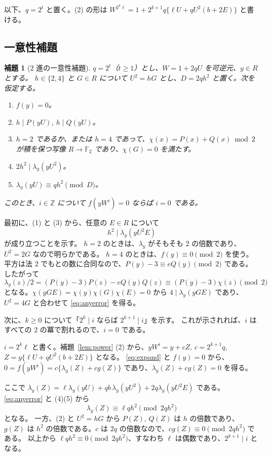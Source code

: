 \documentclass[a4paper,11pt]{ltjsarticle}
\makeatletter
\theoremstyle{jplain}
\newtheorem{lemma}[theorem]{補題}
\renewcommand{\proofname}{証明}
\renewenvironment{proof}[1][\proofname]{\par\pushQED{\qed}\normalfont\topsep6\p@\@plus6\p@\relax
  \trivlist\item[\hskip\labelsep\bfseries #1]\ignorespaces}{\popQED\endtrivlist\@endpefalse}
\numberwithin{equation}{section}
\numberwithin{table}{section}
\newcommand{\Z}{\mathbb{Z}}
\newcommand{\F}{\mathbb{F}}
\makeatother
\begin{document}
以下、$q=2^t$ と置く。(2) の形は $W^{2^k\ell}=1+2^{k+1}q\{\ell U+qU^2(b+2E)\}$ と書ける。

\subsection{一意性補題}

\begin{lemma}[$2$ 進の一意性補題]\label{lem:unique}
$q=2^t$（$t\ge1$）とし、$W=1+2qU$ を可逆元、$y\in R$ とする。
$h\in\{2,4\}$ と $G\in R$ について $U^2=hG$ とし、$D=2qh^2$ と置く。次を仮定する。
\begin{enumerate}
\item $f(y)=0$。
\item $h\mid P(yU)$, $h\mid Q(yU)$。
\item $h=2$ であるか、または $h=4$ であって、$\chi(x)=P(x)+Q(x)\bmod2$ が積を保つ写像 $R\to\F_2$ であり、$\chi(G)=0$ を満たす。
\item $2h^2\mid\lambda_y(yU^2)$。
\item $\lambda_y(yU)\equiv qh^2\pmod D$。
\end{enumerate}
このとき、$i\in\Z$ について $f(yW^i)=0$ ならば $i=0$ である。
\end{lemma}

\begin{proof}
最初に、(1) と (3) から、任意の $E\in R$ について
\begin{equation}\label{eq:anyerror}
h^2\mid\lambda_y(yU^2E)
\end{equation}
が成り立つことを示す。
$h=2$ のときは、$\lambda_y$ がそもそも $2$ の倍数であり、$U^2=2G$ なので明らかである。
$h=4$ のときは、$f(y)\equiv0\pmod2$ を使う。平方は法 $2$ でもとの数に合同なので、$P(y)-3\equiv eQ(y)\pmod2$ である。したがって
\[
\lambda_y(z)/2=(P(y)-3)P(z)-eQ(y)Q(z)\equiv(P(y)-3)\chi(z)\pmod2
\]
となる。$\chi(yGE)=\chi(y)\chi(G)\chi(E)=0$ から $4\mid\lambda_y(yGE)$ であり、$U^2=4G$ と合わせて \eqref{eq:anyerror} を得る。

次に、$k\ge0$ について「$2^k\mid i$ ならば $2^{k+1}\mid i$」を示す。
これが示されれば、$i$ はすべての $2$ の冪で割れるので、$i=0$ である。

$i=2^k\ell$ と書く。補題~\ref{lem:power} (2) から、$yW^i=y+cZ$, $c=2^{k+1}q$, $Z=y\{\ell U+qU^2(b+2E)\}$ となる。
\eqref{eq:expand} と $f(y)=0$ から、$0=f(yW^i)=c\{\lambda_y(Z)+cg(Z)\}$ であり、$\lambda_y(Z)+cg(Z)=0$ を得る。

ここで $\lambda_y(Z)=\ell\lambda_y(yU)+qb\,\lambda_y(yU^2)+2q\lambda_y(yU^2E)$ である。
\eqref{eq:anyerror} と (4)(5) から
\[
\lambda_y(Z)\equiv\ell qh^2\pmod{2qh^2}
\]
となる。
一方、(2) と $U^2=hG$ から $P(Z)$, $Q(Z)$ は $h$ の倍数であり、$g(Z)$ は $h^2$ の倍数である。$c$ は $2q$ の倍数なので、$cg(Z)\equiv0\pmod{2qh^2}$ である。
以上から $\ell qh^2\equiv0\pmod{2qh^2}$、すなわち $\ell$ は偶数であり、$2^{k+1}\mid i$ となる。
\end{proof}
\end{document}
